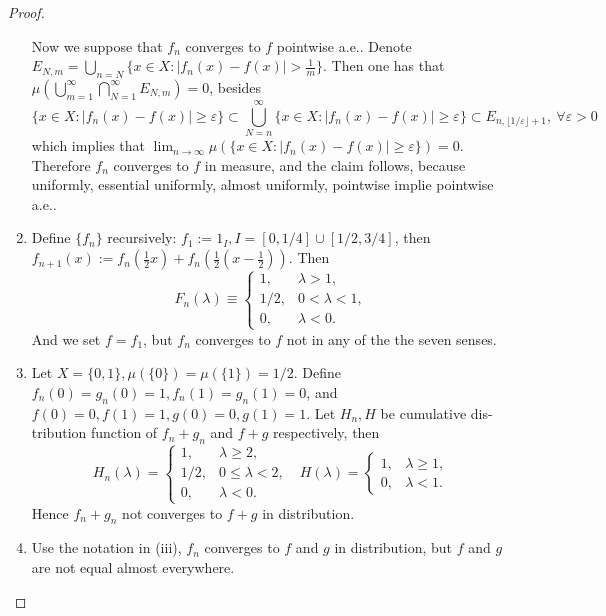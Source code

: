 \documentclass[a4paper]{article}
\begin{document}
\begin{proof}
\begin{enumerate}[label = (\roman*)]
    Now we suppose that $f_n$ converges to $f$ pointwise a.e.. Denote $E_{N, m} = \bigcup_{n = N} \{x \in X : |f_n(x) - f(x)| > \frac{1}{m}\}$.
    Then one has that $\mu(\bigcup_{m = 1}^\infty \bigcap_{N = 1}^\infty E_{N, m}) = 0$, besides $$
    \{x \in X : |f_n(x) - f(x)| \geq \varepsilon\} \subset \bigcup_{N = n}^\infty \{x \in X : |f_n(x) - f(x)| \geq \varepsilon\}
    \subset E_{n, \lfloor 1/\varepsilon \rfloor + 1},\ \forall \varepsilon > 0
    $$which implies that $\lim_{n \to \infty} \mu(\{x \in X : |f_n(x) - f(x)| \geq \varepsilon\}) = 0$. Therefore
    $f_n$ converges to $f$ in measure, and the claim follows, because uniformly, essential uniformly, almost uniformly, 
    pointwise implie pointwise a.e..
    \item Define $\{f_n\}$ recursively: $f_1 := 1_I, I = [0, 1/4] \cup [1/2, 3/4]$, then $f_{n + 1}(x) := f_n(\frac{1}{2}x) + 
    f_n(\frac{1}{2}(x - \frac{1}{2}))$. Then $$
    F_n(\lambda) \equiv \begin{cases}
        1, &\lambda > 1,\\
        1/2, &0 < \lambda < 1,\\
        0, &\lambda < 0. 
    \end{cases}
    $$And we set $f = f_1$, but $f_n$ converges to $f$ not in any of the the seven senses.
    \item Let $X = \{0, 1\}, \mu(\{0\}) = \mu(\{1\}) = 1/2$. Define $f_n(0) = g_n(0) = 1, f_n(1) = g_n(1) = 0$, 
    and $f(0) = 0, f(1) = 1, g(0) = 0, g(1) = 1$. Let $H_n, H$ be cumulative dis- tribution function of $f_n + g_n$
    and $f + g$ respectively, then $$
    H_n(\lambda) = \begin{cases}
        1, &\lambda \geq 2,\\
        1/2, &0 \leq \lambda < 2,\\
        0, &\lambda < 0.
    \end{cases}\ \ \ 
    H(\lambda) = \begin{cases}
        1, &\lambda \geq 1,\\
        0, &\lambda < 1.
    \end{cases}
    $$Hence $f_n + g_n$ not converges to $f + g$ in distribution.
    \item Use the notation in (iii), $f_n$ converges to $f$ and $g$ in distribution, but $f$ and $g$ are not 
    equal almost everywhere.
\end{enumerate}
\end{proof}
\end{document}
